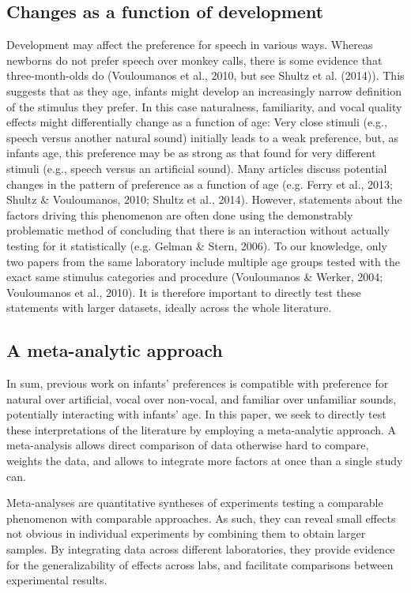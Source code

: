 \documentclass[man]{apa6}
\begin{document}
\subsection{Changes as a function of
development}\label{changes-as-a-function-of-development}

Development may affect the preference for speech in various ways.
Whereas newborns do not prefer speech over monkey calls, there is some
evidence that three-month-olds do (Vouloumanos et al., 2010, but see
Shultz et al. (2014)). This suggests that as they age, infants might
develop an increasingly narrow definition of the stimulus they prefer.
In this case naturalness, familiarity, and vocal quality effects might
differentially change as a function of age: Very close stimuli (e.g.,
speech versus another natural sound) initially leads to a weak
preference, but, as infants age, this preference may be as strong as
that found for very different stimuli (e.g., speech versus an artificial
sound). Many articles discuss potential changes in the pattern of
preference as a function of age (e.g. Ferry et al., 2013; Shultz \&
Vouloumanos, 2010; Shultz et al., 2014). However, statements about the
factors driving this phenomenon are often done using the demonstrably
problematic method of concluding that there is an interaction without
actually testing for it statistically (e.g. Gelman \& Stern, 2006). To
our knowledge, only two papers from the same laboratory include multiple
age groups tested with the exact same stimulus categories and procedure
(Vouloumanos \& Werker, 2004; Vouloumanos et al., 2010). It is therefore
important to directly test these statements with larger datasets,
ideally across the whole literature.

\subsection{A meta-analytic approach}\label{a-meta-analytic-approach}

In sum, previous work on infants' preferences is compatible with
preference for natural over artificial, vocal over non-vocal, and
familiar over unfamiliar sounds, potentially interacting with infants'
age. In this paper, we seek to directly test these interpretations of
the literature by employing a meta-analytic approach. A meta-analysis
allows direct comparison of data otherwise hard to compare, weights the
data, and allows to integrate more factors at once than a single study
can.

Meta-analyses are quantitative syntheses of experiments testing a
comparable phenomenon with comparable approaches. As such, they can
reveal small effects not obvious in individual experiments by combining
them to obtain larger samples. By integrating data across different
laboratories, they provide evidence for the generalizability of effects
across labs, and facilitate comparisons between experimental results.
\end{document}
